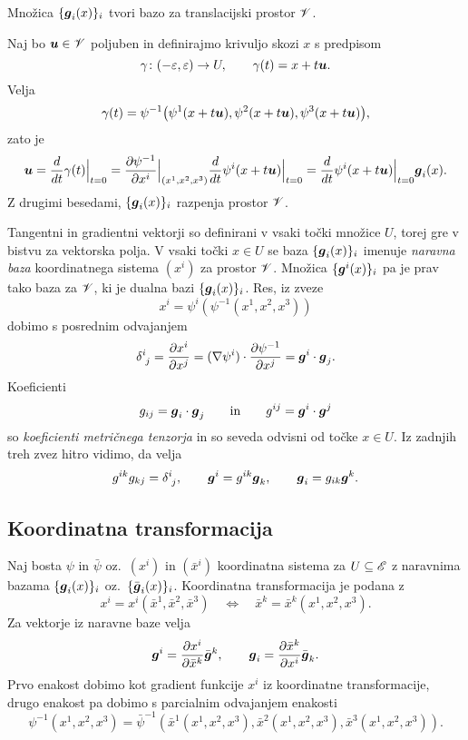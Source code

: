 \begin{trditev}
	Množica $\{\boldsymbol g_i(x)\}_i$ tvori bazo za translacijski prostor $\mathscr V$.
\end{trditev}

\proof
	Naj bo $\boldsymbol u\in\mathscr V$ poljuben in definirajmo krivuljo skozi $x$ s predpisom
	\[ \gamma\colon(-\varepsilon,\varepsilon)\to U,\qquad \gamma(t)=x+t\boldsymbol u. \]
	Velja
	\[ \gamma(t)=\psi^{-1}\big(\psi^1(x+t\boldsymbol u),\psi^2(x+t\boldsymbol u),\psi^3(x+t\boldsymbol u)\big), \]
	zato je
	\[
		\boldsymbol u=\frac{d}{dt}\gamma(t)\Big|_{t=0}=
		\frac{\partial\psi^{-1}}{\partial x^i}\Big|_{(x^1,x^2,x^3)}
		\frac{d}{dt}\psi^i(x+t\boldsymbol u)\Big|_{t=0}=
		\frac{d}{dt}\psi^i(x+t\boldsymbol u)\Big|_{t=0}\boldsymbol g_i(x).
	\]
	Z drugimi besedami, $\{\boldsymbol g_i(x)\}_{i}$ razpenja prostor $\mathscr V$.
\endproof

Tangentni in gradientni vektorji so definirani v vsaki točki množice $U$, torej
gre v bistvu za vektorska polja. V vsaki točki $x\in U$ se baza $\{\boldsymbol g_i(x)\}_i$
imenuje \emph{naravna baza} koordinatnega sistema $(x^i)$ za prostor $\mathscr V$.
Množica $\{\boldsymbol g^i(x)\}_i$ pa je prav tako baza za $\mathscr V$, ki je dualna bazi $\{\boldsymbol g_i(x)\}_i$.
Res, iz zveze
\[ x^i=\psi^i(\psi^{-1}(x^1,x^2,x^3)) \]
dobimo s posrednim odvajanjem
\begin{equation} \label{e:gigj}
	\topbot{\delta}{i}{j}=\frac{\partial x^i}{\partial x^j}=
	(\nabla\psi^i)\cdot\frac{\partial\psi^{-1}}{\partial x^j}=\vek{g}^i\cdot\vek{g}_j.
\end{equation}
Koeficienti
\[ g_{ij}=\boldsymbol g_i\cdot\boldsymbol g_j\qquad\textrm{in}\qquad g^{ij}=\boldsymbol g^i\cdot\boldsymbol g^j \]
so \emph{koeficienti metričnega tenzorja} in so seveda odvisni od točke $x\in U$. 
Iz zadnjih treh zvez hitro vidimo, da velja
\begin{equation} \label{e:relzag}
	g^{ik}g_{kj}=\topbot{\delta}{i}{j},\qquad \vek{g}^i=g^{ik}\vek{g}_k,\qquad \vek{g}_i=g_{ik}\vek{g}^k.
\end{equation}


\subsection{Koordinatna transformacija}


Naj bosta $\psi$ in $\bar{\psi}$ oz.~$(x^i)$ in $(\bar{x}^i)$ koordinatna sistema za
$U\subseteq\mathscr E$ z naravnima bazama $\{\boldsymbol g_i(x)\}_i$ oz.~$\{\bar{\boldsymbol g}_i(x)\}_i$.
Koordinatna transformacija je podana z
\[
	x^i=x^i(\bar{x}^1,\bar{x}^2,\bar{x}^3)\quad\Longleftrightarrow\quad
	\bar{x}^k=\bar{x}^k(x^1,x^2,x^3).
\]
Za vektorje iz naravne baze velja
\begin{equation} \label{e:gtog}
	\boldsymbol g^i=\frac{\partial x^i}{\partial\bar{x}^k}\bar{\boldsymbol g}^k,\qquad
	\boldsymbol g_i=\frac{\partial\bar{x}^k}{\partial x^i}\bar{\boldsymbol g}_k.
\end{equation}
Prvo enakost dobimo kot gradient funkcije $x^i$ iz koordinatne transformacije,
drugo enakost pa dobimo s parcialnim odvajanjem enakosti
\[ 
	\psi^{-1}(x^1,x^2,x^3)=\bar{\psi}^{-1}(\bar{x}^1(x^1,x^2,x^3),
	\bar{x}^2(x^1,x^2,x^3),\bar{x}^3(x^1,x^2,x^3)).
\]

